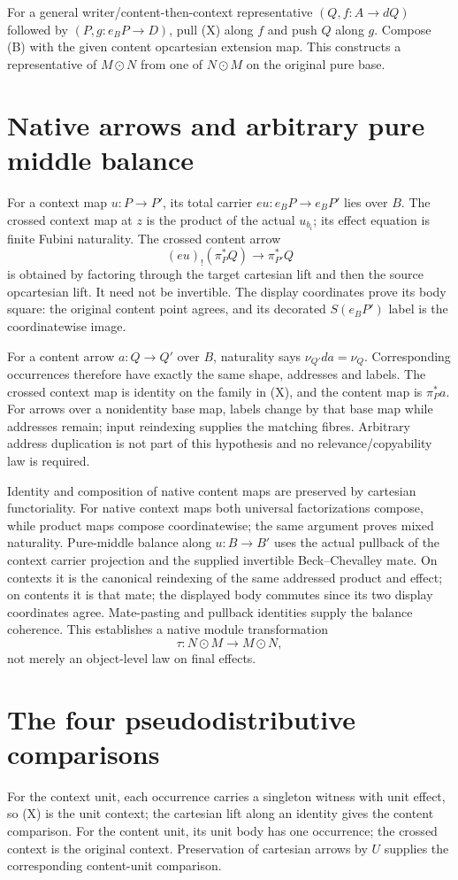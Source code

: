 \documentclass[11pt]{article}
\begin{document}
For a general writer/content-then-context representative $(Q,f:A\to dQ)$ followed by $(P,g:e_BP\to D)$, pull (X) along $f$ and push $\widehat Q$ along $g$. Compose (B) with the given content opcartesian extension map. This constructs a representative of $M\odot N$ from one of $N\odot M$ on the original pure base.

\section{Native arrows and arbitrary pure middle balance}
For a context map $u:P\to P'$, its total carrier $e u:e_BP\to e_BP'$ lies over $B$. The crossed context map at $z$ is the product of the actual $u_{b_i}$; its effect equation is finite Fubini naturality. The crossed content arrow
\[
 (e u)_!(\pi_P^*Q)\longrightarrow\pi_{P'}^*Q
\]
is obtained by factoring through the target cartesian lift and then the source opcartesian lift. It need not be invertible. The display coordinates prove its body square: the original content point agrees, and its decorated $S(e_BP')$ label is the coordinatewise image.

For a content arrow $a:Q\to Q'$ over $B$, naturality says $\nu_{Q'}d a=\nu_Q$. Corresponding occurrences therefore have exactly the same shape, addresses and labels. The crossed context map is identity on the family in (X), and the content map is $\pi_P^*a$. For arrows over a nonidentity base map, labels change by that base map while addresses remain; input reindexing supplies the matching fibres. Arbitrary address duplication is not part of this hypothesis and no relevance/copyability law is required.

Identity and composition of native content maps are preserved by cartesian functoriality. For native context maps both universal factorizations compose, while product maps compose coordinatewise; the same argument proves mixed naturality. Pure-middle balance along $u:B\to B'$ uses the actual pullback of the context carrier projection and the supplied invertible Beck--Chevalley mate. On contexts it is the canonical reindexing of the same addressed product and effect; on contents it is that mate; the displayed body commutes since its two display coordinates agree. Mate-pasting and pullback identities supply the balance coherence. This establishes a native module transformation
\[
 \tau:N\odot M\longrightarrow M\odot N,
\]
not merely an object-level law on final effects.

\section{The four pseudodistributive comparisons}
For the context unit, each occurrence carries a singleton witness with unit effect, so (X) is the unit context; the cartesian lift along an identity gives the content comparison. For the content unit, its unit body has one occurrence; the crossed context is the original context. Preservation of cartesian arrows by $U$ supplies the corresponding content-unit comparison.
\end{document}
